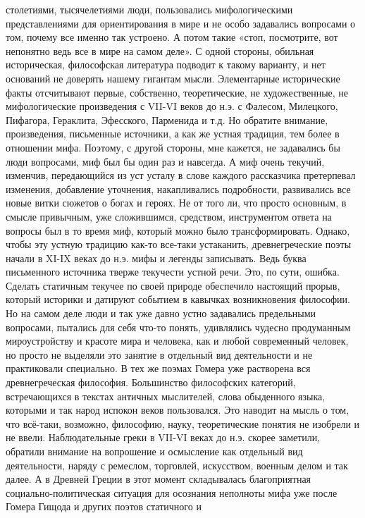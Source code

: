 столетиями, тысячелетиями люди, пользовались мифологическими представлениями для
ориентирования в мире и не особо задавались вопросами о том, почему все именно
так устроено. А потом такие «стоп, посмотрите, вот непонятно ведь все в мире на
самом деле». С одной стороны, обильная историческая, философская литература
подводит к такому варианту, и нет оснований не доверять нашему гигантам мысли.
Элементарные исторические факты отсчитывают первые, собственно, теоретические,
не художественные, не мифологические произведения с VII-VI веков до н.э. с
Фалесом, Милецкого, Пифагора, Гераклита, Эфесского, Парменида и т.д. Но обратите
внимание, произведения, письменные источники, а как же устная традиция, тем
более в отношении мифа. Поэтому, с другой стороны, мне кажется, не задавались бы
люди вопросами, миф был бы один раз и навсегда. А миф очень текучий, изменчив,
передающийся из уст усталу в слове каждого рассказчика претерпевал изменения,
добавление уточнения, накапливались подробности, развивались все новые витки
сюжетов о богах и героях. Не от того ли, что просто основным, в смысле
привычным, уже сложившимся, средством, инструментом ответа на вопросы был в то
время миф, который можно было трансформировать. Однако, чтобы эту устную
традицию как-то все-таки устаканить, древнегреческие поэты начали в XI-IX веках
до н.э. мифы и легенды записывать. Ведь буква письменного источника тверже
текучести устной речи. Это, по сути, ошибка. Сделать статичным текучее по своей
природе обеспечило настоящий прорыв, который историки и датируют событием в
кавычках возникновения философии. Но на самом деле люди и так уже давно устно
задавались предельными вопросами, пытались для себя что-то понять, удивлялись
чудесно продуманным мироустройству и красоте мира и человека, как и любой
современный человек, но просто не выделяли это занятие в отдельный вид
деятельности и не практиковали специально. В тех же поэмах Гомера уже растворена
вся древнегреческая философия. Большинство философских категорий, встречающихся
в текстах античных мыслителей, слова обыденного языка, которыми и так народ
испокон веков пользовался. Это наводит на мысль о том, что всё-таки, возможно,
философию, науку, теоретические понятия не изобрели и не ввели. Наблюдательные
греки в VII-VI веках до н.э. скорее заметили, обратили внимание на вопрошение и
осмысление как отдельный вид деятельности, наряду с ремеслом, торговлей,
искусством, военным делом и так далее. А в Древней Греции в этот момент
складывалась благоприятная социально-политическая ситуация для осознания
неполноты мифа уже после Гомера Гищода и других поэтов статичного и
